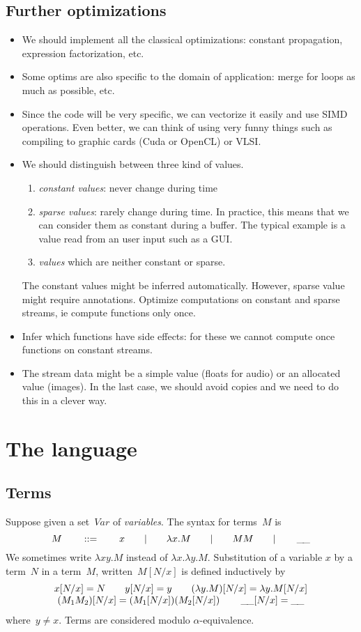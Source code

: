 \documentclass[a4paper,titlepage]{article}
\newcommand{\Var}{Var}
\newcommand{\hole}{\mathop{\_\hspace{-.3ex}\_}}
\begin{document}
\subsection{Further optimizations}
\begin{itemize}
\item We should implement all the classical optimizations: constant propagation,
  expression factorization, etc.
\item Some optims are also specific to the domain of application: merge for
  loops as much as possible, etc.
\item Since the code will be very specific, we can vectorize it easily and use
  SIMD operations. Even better, we can think of using very funny things such as
  compiling to graphic cards (Cuda or OpenCL) or VLSI.
\item We should distinguish between three kind of values.
  \begin{enumerate}
  \item \emph{constant values}: never change during time
  \item \emph{sparse values}: rarely change during time. In practice, this means
    that we can consider them as constant during a buffer. The typical example
    is a value read from an user input such as a GUI.
  \item \emph{values} which are neither constant or sparse.
  \end{enumerate}
  The constant values might be inferred automatically. However, sparse value
  might require annotations. Optimize computations on constant and sparse
  streams, ie compute functions only once.
\item Infer which functions have side effects: for these we cannot compute once
  functions on constant streams.
\item The stream data might be a simple value (floats for audio) or an allocated
  value (images). In the last case, we should avoid copies and we need to do
  this in a clever way.
\end{itemize}

\section{The language}
\subsection{Terms}
Suppose given a set~$\Var$ of \emph{variables}. The syntax for terms~$M$ is
\[
M
\qquad::=\qquad
x
\qquad|\qquad
\lambda x.M
\qquad|\qquad
MM
\qquad|\qquad
\hole
\]
We sometimes write $\lambda xy.M$ instead of $\lambda x.\lambda
y.M$. Substitution of a variable $x$ by a term~$N$ in a term~$M$,
written~$M[N/x]$ is defined inductively by
\[
\begin{array}{c}
  x[N/x]=N
  \qquad
  y[N/x]=y
  \qquad
  (\lambda y.M)[N/x]=\lambda y.M[N/x]
  \\
  (M_1M_2)[N/x]=(M_1[N/x])(M_2[N/x])
  \qquad
  \hole[N/x]=\hole
\end{array}
\]
where~$y\neq x$. Terms are considered modulo $\alpha$-equivalence.
\end{document}

